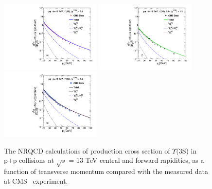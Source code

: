 \documentclass[twocolumn,amsmath,amssymb]{snp}
\begin{document}
\begin{figure}
  \includegraphics[width=0.45\textwidth]{Y3S_CMS_13TeV_Rap06.pdf}
  \includegraphics[width=0.45\textwidth]{Y3S_CMS_13TeV_Rap0612.pdf} 
  \includegraphics[width=0.45\textwidth]{Y3S_CMS_13TeV_Rap12.pdf}
 \caption{The NRQCD calculations of production cross section of $\Upsilon$(3S) in p+p collisions at 
   $\sqrt{s}$ = 13 TeV central and forward rapidities, as a function of transverse momentum compared with the measured data 
   at CMS~\cite{CMS13TeV} experiment. }
  \label{Fig:SigmaY3SCMS13TeV}
\end{figure}
\end{document}
